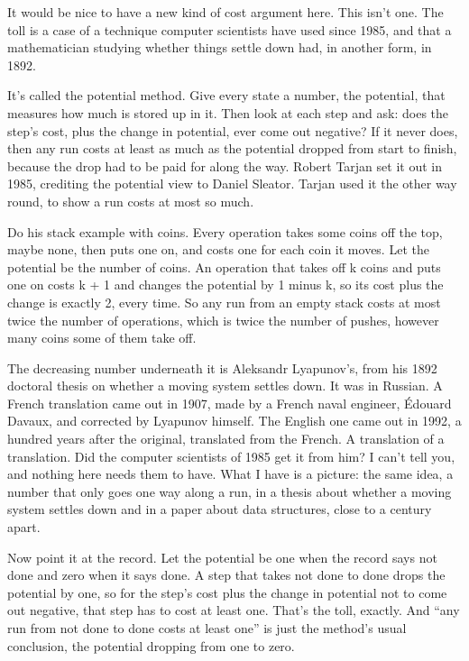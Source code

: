 \documentclass[11pt,twoside]{article}
\theoremstyle{thielethm}
\theoremstyle{thieledef}
\theoremstyle{thieledef}
\theoremstyle{thieledef}
\theoremstyle{thielethm}
\theoremstyle{thieleobs}
\theoremstyle{thielethm}
\begin{document}
It would be nice to have a new kind of cost argument here. This isn't one. The toll is a case of a technique computer scientists have used since 1985, and that a mathematician studying whether things settle down had, in another form, in 1892.

It's called the potential method. Give every state a number, the potential, that measures how much is stored up in it. Then look at each step and ask: does the step's cost, plus the change in potential, ever come out negative? If it never does, then any run costs at least as much as the potential dropped from start to finish, because the drop had to be paid for along the way. Robert Tarjan set it out in 1985, crediting the potential view to Daniel Sleator. Tarjan used it the other way round, to show a run costs at most so much.

Do his stack example with coins. Every operation takes some coins off the top, maybe none, then puts one on, and costs one for each coin it moves. Let the potential be the number of coins. An operation that takes off k coins and puts one on costs k + 1 and changes the potential by 1 minus k, so its cost plus the change is exactly 2, every time. So any run from an empty stack costs at most twice the number of operations, which is twice the number of pushes, however many coins some of them take off.

The decreasing number underneath it is Aleksandr Lyapunov's, from his 1892 doctoral thesis on whether a moving system settles down. It was in Russian. A French translation came out in 1907, made by a French naval engineer, Édouard Davaux, and corrected by Lyapunov himself. The English one came out in 1992, a hundred years after the original, translated from the French. A translation of a translation. Did the computer scientists of 1985 get it from him? I can't tell you, and nothing here needs them to have. What I have is a picture: the same idea, a number that only goes one way along a run, in a thesis about whether a moving system settles down and in a paper about data structures, close to a century apart.

Now point it at the record. Let the potential be one when the record says not done and zero when it says done. A step that takes not done to done drops the potential by one, so for the step's cost plus the change in potential not to come out negative, that step has to cost at least one. That's the toll, exactly. And ``any run from not done to done costs at least one'' is just the method's usual conclusion, the potential dropping from one to zero.
\end{document}
